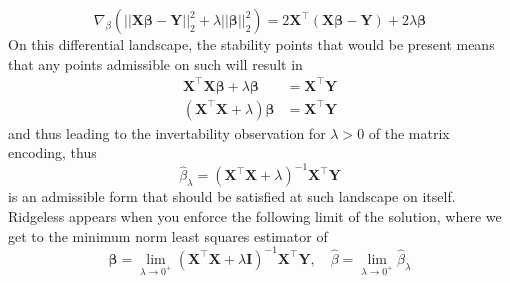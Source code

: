 \begin{equation}
    \nabla_{\beta}\left(||\mathbf{X}\bm{\beta} - \mathbf{Y}||^{2}_{2} + \lambda||\bm{\beta}||^{2}_{2}\right) = 2\mathbf{X}^{\top}(\mathbf{X}\bm{\beta}-\mathbf{Y})+2\lambda \bm{\beta}
\end{equation}
On this differential landscape, the stability points that would be present means that any points admissible on such will result in 
\begin{align}
    \mathbf{X}^{\top}\mathbf{X}\bm{\beta}+\lambda \bm{\beta} &= \mathbf{X}^{\top}\mathbf{Y}\\
    (\mathbf{X}^{\top}\mathbf{X}+\lambda) \bm{\beta} &= \mathbf{X}^{\top}\mathbf{Y}
\end{align}
and thus leading to the invertability observation for $\lambda >0$ of the matrix encoding, thus
\begin{equation}
    \hat{\beta}_{\lambda} = (\mathbf{X}^{\top}\mathbf{X}+\lambda)^{-1}\mathbf{X}^{\top}\mathbf{Y}
\end{equation}
is an admissible form that should be satisfied at such landscape on itself. Ridgeless appears when you enforce the following limit of the solution, where we get to the minimum norm least squares estimator of
$$
\hat{\bm{\beta}} = \lim_{\lambda \to 0 ^{+}} (\mathbf{X}^{\top}\mathbf{X}+\lambda \mathbf{I})^{-1} \mathbf{X}^{\top}\mathbf{Y}, \quad \hat{\beta} = \lim_{\lambda\to 0^{+}} \hat{\beta}_{\lambda}
$$
